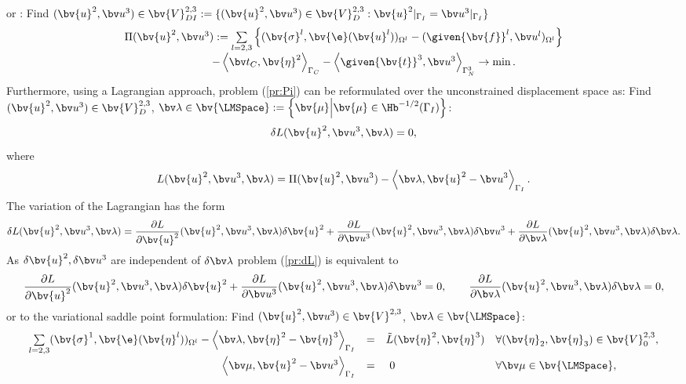 or : Find $(\bv{u}^2, \bv u^3) \in \bv{V}^{2,3}_{DI} := \{(\bv{u}^2,\bv u^3) \in \bv{V}^{2,3}_D: \bv{u}^2|_{\Gamma_I} = \bv u^3|_{\Gamma_I}\}$
\begin{equation} \label{pr:Pi}
\begin{array}{l}
\Pi (\bv{u}^2, \bv u^3) := \sum \limits_{l=2,3} \left\lbrace 
   (\bv{\sigma}^l,\bv{\e}(\bv{u}^l))_{\Omega^l}
 - (\given{\bv{f}}^{l}, \bv u^l)_{\Omega^l} \right\rbrace \\
\qquad \qquad \qquad \qquad
 - \left\langle \bv t_C, \bv{\eta}^2 \right\rangle_{\Gamma_C}
 - \left\langle \given{\bv{t}}^3, \bv u^3 \right\rangle_{\Gamma_N^3} \rightarrow \min. 
\end{array}
\end{equation}
Furthermore, using a Lagrangian approach,  problem (\ref{pr:Pi}) can be reformulated over the unconstrained displacement space as:
Find $(\bv{u}^2,\bv u^3) \in \bv{V}^{2,3}_D$, $\bv \lambda \in \bv{\LMSpace}:=\left\lbrace \bv{\mu}\middle| \bv{\mu}\in \Hb^{-1/2}(\Gamma_I)\right\rbrace $:
\begin{equation} \label{pr:dL}
\delta L (\bv{u}^2,\bv u^3,\bv \lambda) = 0,
\end{equation}
where
\[
L (\bv{u}^2,\bv u^3,\bv \lambda) = \Pi (\bv{u}^2, \bv u^3) 
- \left\langle \bv \lambda , \bv{u}^2 - \bv u^3 \right\rangle_{\Gamma_I}.
\]
The variation of the Lagrangian has the form
\[
\delta L (\bv{u}^2,\bv u^3,\bv \lambda) = 
\dfrac{\partial L}{\partial \bv{u}^2}(\bv{u}^2,\bv u^3,\bv \lambda) \delta \bv{u}^2 
+ \dfrac{\partial L}{\partial \bv u^3}(\bv{u}^2,\bv u^3,\bv \lambda) \delta \bv u^3 
+ \dfrac{\partial L}{\partial \bv \lambda} (\bv{u}^2,\bv u^3,\bv \lambda) \delta\bv  \lambda.
\]
As $\delta \bv{u}^2, \delta \bv u^3$ are independent of $\delta \bv \lambda$ problem (\ref{pr:dL}) is equivalent to
\[
\dfrac{\partial L}{\partial \bv{u}^2}(\bv{u}^2,\bv u^3,\bv \lambda) \delta \bv{u}^2 +
\dfrac{\partial L}{\partial \bv u^3}(\bv{u}^2,\bv u^3,\bv \lambda) \delta \bv u^3 = 0,
\qquad
\dfrac{\partial L}{\partial \bv \lambda} (\bv{u}^2,\bv u^3,\bv \lambda) \delta \bv \lambda = 0,
\]
or to the variational saddle point formulation: Find $(\bv{u}^2,\bv u^3) \in \bv{V}^{2,3}$, $\bv \lambda \in \bv{\LMSpace}$:
\begin{equation} \label{pr:LM23}
\begin{array}{rcll}
\sum \limits_{l=2,3} 
   (\bv{\sigma}^1,\bv{\e}(\bv{\eta}^l))_{\Omega^l}
 - \left\langle \bv \lambda, \bv{\eta}^2 - \bv{\eta}^3 \right\rangle_{\Gamma_I} 
&=&\tilde L(\bv{\eta}^2, \bv{\eta}^3) &\forall (\bv{\eta}_2,\bv{\eta}_3) \in \bv{V}^{2,3}_0, \\[2ex]
 \left\langle \bv \mu, \bv{u}^2 - \bv u^3 \right\rangle_{\Gamma_I} 
 &=&\,\, 0   
  &\forall \bv \mu \in \bv{\LMSpace},
\end{array}
\end{equation}
